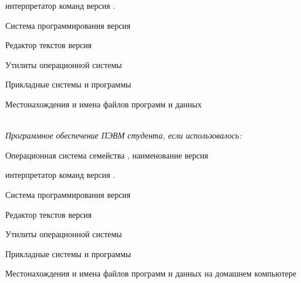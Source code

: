 интерпретатор команд \uline{\hspace{3cm}} версия \uline{\hspace{2cm}}.

Система программирования \uline{\hspace{8.25cm}} версия  \uline{\hfill}

Редактор текстов \uline{\hspace{9.9cm}} версия  \uline{\hfill}

Утилиты операционной системы \uline{\hfill}

\uline{\hfill}

Прикладные системы и программы \uline{\hfill}

Местонахождения и имена файлов программ и данных \uline{\hfill}

\uline{\hfill}\\

\textit{Программное обеспечение ПЭВМ студента, если использовалось:}

Операционная система семейства \uline{\hspace{2cm}}, наименование \uline{\hspace{3cm}} версия \uline{\hfill}

интерпретатор команд \uline{\hspace{3cm}} версия \uline{\hspace{2cm}}.

Система программирования \uline{\hspace{8.25cm}} версия  \uline{\hfill}

Редактор текстов \uline{\hspace{9.9cm}} версия  \uline{\hfill}

Утилиты операционной системы \uline{\hfill}

\uline{\hfill}

Прикладные системы и программы \uline{\hfill}

Местонахождения и имена файлов программ и данных на домашнем компьютере \uline{\hfill}

\uline{\hfill}

\newpage